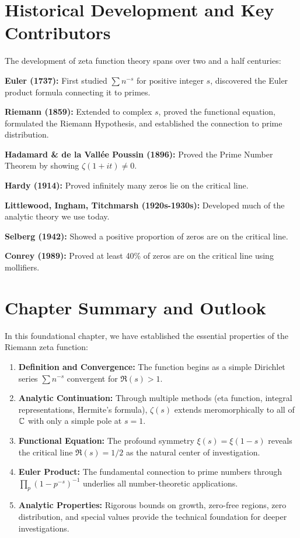 \section{Historical Development and Key Contributors}
\label{sec:historical_development}

\begin{historicalnote}
The development of zeta function theory spans over two and a half centuries:

\textbf{Euler (1737):} First studied $\sum n^{-s}$ for positive integer $s$, discovered the Euler product formula connecting it to primes.

\textbf{Riemann (1859):} Extended to complex $s$, proved the functional equation, formulated the Riemann Hypothesis, and established the connection to prime distribution.

\textbf{Hadamard \& de la Vallée Poussin (1896):} Proved the Prime Number Theorem by showing $\zeta(1+it) \neq 0$.

\textbf{Hardy (1914):} Proved infinitely many zeros lie on the critical line.

\textbf{Littlewood, Ingham, Titchmarsh (1920s-1930s):} Developed much of the analytic theory we use today.

\textbf{Selberg (1942):} Showed a positive proportion of zeros are on the critical line.

\textbf{Conrey (1989):} Proved at least 40\% of zeros are on the critical line using mollifiers.
\end{historicalnote}

\section{Chapter Summary and Outlook}
\label{sec:chapter_summary}

In this foundational chapter, we have established the essential properties of the Riemann zeta function:

\begin{enumerate}
\item \textbf{Definition and Convergence:} The function begins as a simple Dirichlet series $\sum n^{-s}$ convergent for $\Re(s) > 1$.

\item \textbf{Analytic Continuation:} Through multiple methods (eta function, integral representations, Hermite's formula), $\zeta(s)$ extends meromorphically to all of $\mathbb{C}$ with only a simple pole at $s = 1$.

\item \textbf{Functional Equation:} The profound symmetry $\xi(s) = \xi(1-s)$ reveals the critical line $\Re(s) = 1/2$ as the natural center of investigation.

\item \textbf{Euler Product:} The fundamental connection to prime numbers through $\prod_p (1-p^{-s})^{-1}$ underlies all number-theoretic applications.

\item \textbf{Analytic Properties:} Rigorous bounds on growth, zero-free regions, zero distribution, and special values provide the technical foundation for deeper investigations.
\end{enumerate}

